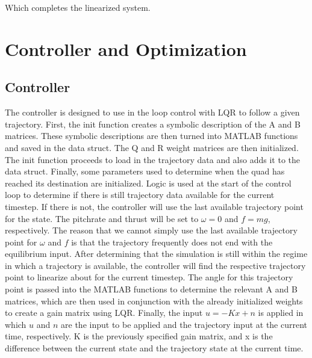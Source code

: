 \documentclass[12pt]{article}
\begin{document}
	Which completes the linearized system.
	
	\section{Controller and Optimization}
	\subsection{Controller}
	The controller is designed to use in the loop control with LQR to follow a given trajectory. First, the init function creates a symbolic description of the A and B matrices.  These symbolic descriptions are then turned into MATLAB functions and saved in the data struct.  The Q and R weight matrices are then initialized.  The init function proceeds to load in the trajectory data and also adds it to the data struct.  Finally, some parameters used to determine when the quad has reached its destination are initialized.
	\newline
	\newline
	Logic is used at the start of the control loop to determine if there is still trajectory data available for the current timestep.  If there is not, the controller will use the last available trajectory point for the state.  The pitchrate and thrust will be set to $\omega = 0$ and $f = mg$, respectively.  The reason that we cannot simply use the last available trajectory point for $\omega$ and $f$ is that the trajectory frequently does not end with the equilibrium input.
	\newline
	\newline
	After determining that the simulation is still within the regime in which a trajectory is available, the controller will find the respective trajectory point to linearize about for the current timestep.  The angle for this trajectory point is passed into the MATLAB functions to determine the relevant A and B matrices, which are then used in conjunction with the already initialized weights to create a gain matrix using LQR.
	\newline
	\newline
	Finally, the input $u = -Kx + n$ is applied in which $u$ and $n$ are the input to be applied and the trajectory input at the current time, respectively.  K is the previously specified gain matrix, and x is the difference between the current state and the trajectory state at the current time.
	
\end{document}
